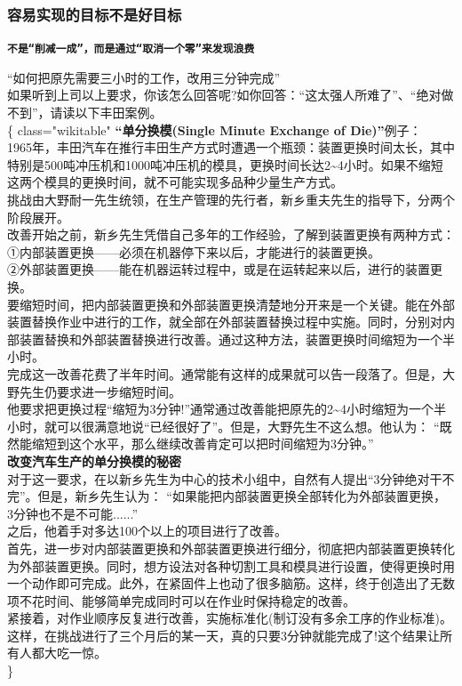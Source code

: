 \hypertarget{ux5bb9ux6613ux5b9eux73b0ux7684ux76eeux6807ux4e0dux662fux597dux76eeux6807}{%
\subsubsection{容易实现的目标不是好目标}\label{ux5bb9ux6613ux5b9eux73b0ux7684ux76eeux6807ux4e0dux662fux597dux76eeux6807}}

\textbf{\texttt{不是“削减一成”，而是通过“取消一个零”来发现浪费}}

``如何把原先需要三小时的工作，改用三分钟完成''\\
如果听到上司以上要求，你该怎么回答呢?如你回答：``这太强人所难了''、``绝对做不到''，请读以下丰田案例。\\
\{\textbar{} class="wikitable" \textbar{}\textbf{``单分换模(Single
Minute Exchange of Die)''}例子：\\
1965年，丰田汽车在推行丰田生产方式时遭遇一个瓶颈：装置更换时间太长，其中特别是500吨冲压机和1000吨冲压机的模具，更换时间长达2\textasciitilde{}4小时。如果不缩短这两个模具的更换时间，就不可能实现多品种少量生产方式。\\
挑战由大野耐一先生统领，在生产管理的先行者，新乡重夫先生的指导下，分两个阶段展开。\\
改善开始之前，新乡先生凭借自己多年的工作经验，了解到装置更换有两种方式：\\
①内部装置更换------必须在机器停下来以后，才能进行的装置更换。\\
②外部装置更换------能在机器运转过程中，或是在运转起来以后，进行的装置更换。\\
要缩短时间，把内部装置更换和外部装置更换清楚地分开来是一个关键。能在外部装置替换作业中进行的工作，就全部在外部装置替换过程中实施。同时，分别对内部装置替换和外部装置替换进行改善。通过这种方法，装置更换时间缩短为一个半小时。\\
完成这一改善花费了半年时间。通常能有这样的成果就可以告一段落了。但是，大野先生仍要求进一步缩短时间。\\
他要求把更换过程``缩短为3分钟!''通常通过改善能把原先的2\textasciitilde{}4小时缩短为一个半小时，就可以很满意地说``已经很好了''。但是，大野先生不这么想。他认为：
``既然能缩短到这个水平，那么继续改善肯定可以把时间缩短为3分钟。''\\
\textbf{改变汽车生产的单分换模的秘密}\\
对于这一要求，在以新乡先生为中心的技术小组中，自然有人提出``3分钟绝对干不完''。但是，新乡先生认为：
``如果能把内部装置更换全部转化为外部装置更换，
3分钟也不是不可能......''\\
之后，他着手对多达100个以上的项目进行了改善。\\
首先，进一步对内部装置更换和外部装置更换进行细分，彻底把内部装置更换转化为外部装置更换。同时，想方设法对各种切割工具和模具进行设置，使得更换时用一个动作即可完成。此外，在紧固件上也动了很多脑筋。这样，终于创造出了无数项不花时间、能够简单完成同时可以在作业时保持稳定的改善。\\
紧接着，对作业顺序反复进行改善，实施标准化(制订没有多余工序的作业标准)。这样，在挑战进行了三个月后的某一天，真的只要3分钟就能完成了!这个结果让所有人都大吃一惊。\\
\textbar{}\}

